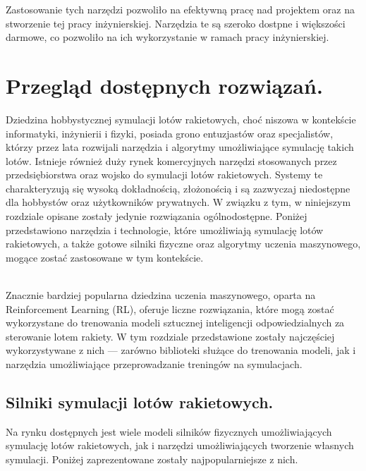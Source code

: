 Zastosowanie tych narzędzi pozwoliło na efektywną pracę nad projektem oraz
na stworzenie tej pracy inżynierskiej. Narzędzia te są szeroko dostpne i
większości darmowe, co pozwoliło na ich wykorzystanie w ramach pracy inżynierskiej.

\section{Przegląd dostępnych rozwiązań. }

Dziedzina hobbystycznej symulacji lotów rakietowych, choć niszowa w kontekście informatyki, inżynierii i fizyki, posiada grono entuzjastów oraz specjalistów, którzy przez lata rozwijali narzędzia i algorytmy umożliwiające symulację takich lotów. Istnieje również duży rynek komercyjnych narzędzi stosowanych przez przedsiębiorstwa oraz wojsko do symulacji lotów rakietowych. Systemy te charakteryzują się wysoką dokładnością, złożonością i są zazwyczaj niedostępne dla hobbystów oraz użytkowników prywatnych. W związku z tym, w niniejszym rozdziale opisane zostały jedynie rozwiązania ogólnodostępne. Poniżej przedstawiono narzędzia i technologie, które umożliwiają symulację lotów rakietowych, a także gotowe silniki fizyczne oraz algorytmy uczenia maszynowego, mogące zostać zastosowane w tym kontekście.

\\Znacznie bardziej popularna dziedzina uczenia maszynowego, oparta na
Reinforcement Learning (RL), oferuje liczne rozwiązania, które mogą zostać wykorzystane do trenowania modeli sztucznej inteligencji odpowiedzialnych za sterowanie lotem rakiety. W tym rozdziale przedstawione zostały najczęściej wykorzystywane z nich — zarówno biblioteki służące do trenowania modeli, jak i narzędzia umożliwiające przeprowadzanie treningów na symulacjach.


\subsection{Silniki symulacji lotów rakietowych.}

Na rynku dostępnych jest wiele modeli silników fizycznych umożliwiających
symulację lotów rakietowych, jak i narzędzi umożliwiających tworzenie
własnych symulacji. Poniżej zaprezentowane zostały najpopularniejsze z nich. \\

